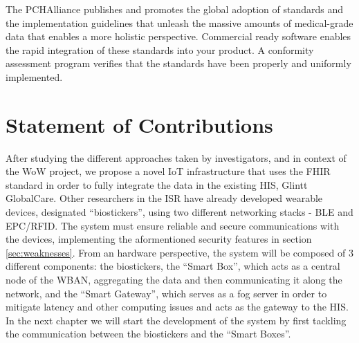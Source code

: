 The PCHAlliance publishes and promotes the global adoption of standards and the implementation guidelines that unleash the massive amounts of medical-grade data that enables a more holistic perspective. Commercial ready software enables the rapid integration of these standards into your product. A conformity assessment program verifies that the standards have been properly and uniformly implemented.


\section{Statement of Contributions}

After studying the different approaches taken by investigators, and in context of the \acs{WoW} project, we propose a novel \acs{IoT} infrastructure that uses the \acs{FHIR} standard in order to fully integrate the data in the existing \acs{HIS}, Glintt GlobalCare. Other researchers in the \acs{ISR} have already developed wearable devices, designated ``biostickers'', using two different networking stacks - BLE and EPC/RFID. The system must ensure reliable and secure communications with the devices, implementing the aformentioned security features in section \ref{sec:weaknesses}. From an hardware perspective, the system will be composed of 3 different components: the biostickers, the ``Smart Box'', which acts as a central node of the WBAN, aggregating the data and then communicating it along the network, and the ``Smart Gateway'', which serves as a fog server in order to mitigate latency and other computing issues and acts as the gateway to the \acs{HIS}. In the next chapter we will start the development of the system by first tackling the communication between the biostickers and the ``Smart Boxes''. \bigskip